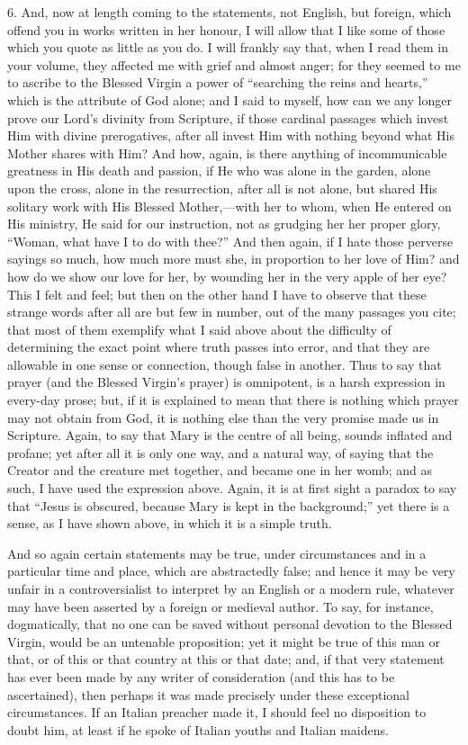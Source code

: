 6. And, now at length coming to the statements, not English, but
foreign, which offend you in works written in her honour, I will allow
that I like some of those which you quote as little as you do. I will
frankly say that, when I read them in your volume, they affected me with
grief and almost anger; for they seemed to me to ascribe to the Blessed
Virgin a power of ``searching the reins and hearts,'' which is
the attribute of God alone; and I said to myself, how can we any longer
prove our Lord's divinity from Scripture, if those cardinal passages
which invest Him with divine prerogatives, after all invest Him with
nothing beyond what His Mother shares with Him? And how, again, is there
anything of incommunicable greatness in His death and passion, if He who
was alone in the garden, alone upon the cross, alone in the
resurrection, after all is not alone, but shared His solitary work with
His Blessed Mother,—with her to whom, when He entered on His ministry,
He said for our instruction, not as grudging her her proper glory,
``Woman, what have I to do with thee?'' And then again, if I
hate those perverse sayings so much, how much more must she, in
proportion to her love of Him? and how do we show our love for her, by
wounding her in the very apple of her eye? This I felt and feel; but
then on the other hand I have to observe that these strange words after
all are but few in number, out of the many passages you cite; that most
of them exemplify what I said above about the difficulty of
determining the exact point where truth passes into error, and that they
are allowable in one sense or connection, though false in another. Thus
to say that prayer (and the Blessed Virgin's prayer) is omnipotent, is a
harsh expression in every-day prose; but, if it is explained to mean
that there is nothing which prayer may not obtain from God, it is
nothing else than the very promise made us in Scripture. Again, to say
that Mary is the centre of all being, sounds inflated and profane; yet
after all it is only one way, and a natural way, of saying that the
Creator and the creature met together, and became one in her womb; and
as such, I have used the expression above. Again, it is at first sight a
paradox to say that ``Jesus is obscured, because Mary is kept in the
background;'' yet there is a sense, as I have shown above, in which
it is a simple truth.

And so again certain statements may be true, under circumstances and
in a particular time and place, which are abstractedly false; and hence
it may be very unfair in a controversialist to interpret by an English
or a modern rule, whatever may have been asserted by a foreign or
medieval author. To say, for instance, dogmatically, that no one can be
saved without personal devotion to the Blessed Virgin, would be an
untenable proposition; yet it might be true of this man or that, or of
this or that country at this or that date; and, if that very statement
has ever been made by any writer of consideration (and this has to be
ascertained), then perhaps it was made precisely under these exceptional
circumstances. If an Italian preacher made it, I should feel no
disposition to doubt him, at least if he spoke of Italian youths and
Italian maidens.

